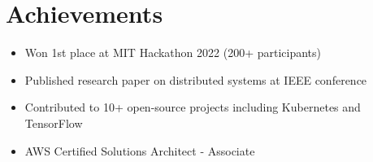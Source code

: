 \documentclass{article}
\begin{document}
\section{Achievements}

\begin{itemize}
\item Won 1st place at MIT Hackathon 2022 (200+ participants)
\item Published research paper on distributed systems at IEEE conference
\item Contributed to 10+ open-source projects including Kubernetes and TensorFlow
\item AWS Certified Solutions Architect - Associate
\end{itemize}
\end{document}
